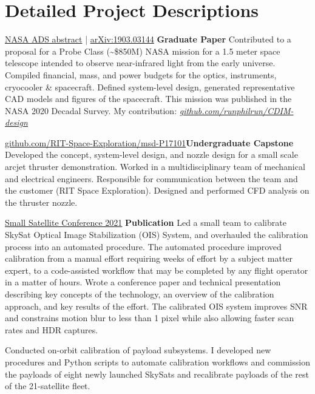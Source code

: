 \documentclass[10pt,final,sans]{resume}
\begin{document}
\break
\section{Detailed Project Descriptions}

{\href{https://ui.adsabs.harvard.edu/abs/2019BAAS...51g..23C/abstract}{NASA ADS abstract} | \href{https://arxiv.org/abs/1903.03144}{arXiv:1903.03144}}
{\bf Graduate Paper}
Contributed to a proposal for a Probe Class (\textasciitilde\$850M) NASA mission
for a 1.5 meter space telescope intended to observe near-infrared light from the
early universe. Compiled financial, mass, and power budgets for the optics,
instruments, cryocooler \& spacecraft. Defined system-level design, generated
representative CAD models and figures of the spacecraft. This mission was 
published in the NASA 2020 Decadal Survey. My contribution: \href{https://github.com/runphilrun/CDIM-design/blob/master/cdim_design.pdf}{\it github.com/runphilrun/CDIM-design}

{\href{https://github.com/RIT-Space-Exploration/msd-P17101/blob/master/p17101.pdf}
{github.com/RIT-Space-Exploration/msd-P17101}}{\bf Undergraduate Capstone}
Developed the concept, system-level design, and nozzle design for a small scale
arcjet thruster demonstration. Worked in a multidisciplinary team of mechanical
and electrical engineers. Responsible for communication between the team and the
customer (RIT Space Exploration). Designed and performed CFD analysis on the
thruster nozzle.

{\href{https://digitalcommons.usu.edu/smallsat/2021/all2021/189/}{Small Satellite Conference 2021}}
{\bf Publication}
Led a small team to calibrate SkySat Optical Image Stabilization (OIS) System,
and overhauled the calibration process into an automated procedure. The
automated procedure improved calibration from a manual effort requiring weeks
of effort by a subject matter expert, to a code-assisted workflow that may be
completed by any flight operator in a matter of hours. Wrote a conference paper
and technical presentation describing key concepts of the technology, an
overview of the calibration approach, and key results of the effort. The
calibrated OIS system improves SNR and constrains motion blur to less than 1
pixel while also allowing faster scan rates and HDR captures.

Conducted on-orbit calibration of payload subsystems. I developed new
procedures and Python scripts to automate calibration workflows and commission
the payloads of eight newly launched SkySats and recalibrate payloads of the
rest of the 21-satellite fleet.
\end{document}
